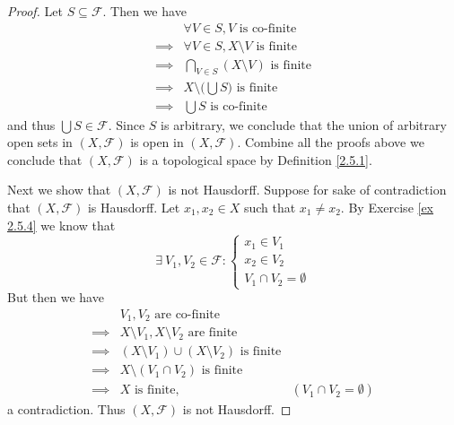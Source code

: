 \begin{proof}
    Let \(S \subseteq \mathcal{F}\).
    Then we have
    \begin{align*}
                 & \forall V \in S, V \text{ is co-finite}             \\
        \implies & \forall V \in S, X \setminus V \text{ is finite}    \\
        \implies & \bigcap_{V \in S} (X \setminus V) \text{ is finite} \\
        \implies & X \setminus \bigg(\bigcup S\bigg) \text{ is finite} \\
        \implies & \bigcup S \text{ is co-finite}
    \end{align*}
    and thus \(\bigcup S \in \mathcal{F}\).
    Since \(S\) is arbitrary, we conclude that the union of arbitrary open sets in \((X, \mathcal{F})\) is open in \((X, \mathcal{F})\).
    Combine all the proofs above we conclude that \((X, \mathcal{F})\) is a topological space by Definition \ref{2.5.1}.

    Next we show that \((X, \mathcal{F})\) is not Hausdorff.
    Suppose for sake of contradiction that \((X, \mathcal{F})\) is Hausdorff.
    Let \(x_1, x_2 \in X\) such that \(x_1 \neq x_2\).
    By Exercise \ref{ex 2.5.4} we know that
    \[
        \exists\ V_1, V_2 \in \mathcal{F} : \begin{cases}
            x_1 \in V_1 \\
            x_2 \in V_2 \\
            V_1 \cap V_2 = \emptyset
        \end{cases}
    \]
    But then we have
    \begin{align*}
                 & V_1, V_2 \text{ are co-finite}                                                          \\
        \implies & X \setminus V_1, X \setminus V_2 \text{ are finite}                                     \\
        \implies & (X \setminus V_1) \cup (X \setminus V_2) \text{ is finite}                              \\
        \implies & X \setminus (V_1 \cap V_2) \text{ is finite}                                            \\
        \implies & X \text{ is finite},                                       & (V_1 \cap V_2 = \emptyset)
    \end{align*}
    a contradiction.
    Thus \((X, \mathcal{F})\) is not Hausdorff.


\end{proof}
